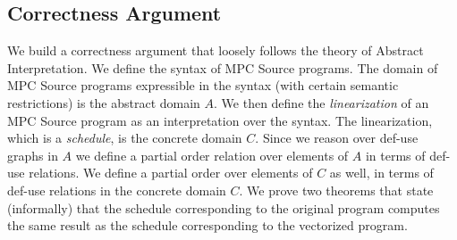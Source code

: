 \begin{algorithmic}

\ENDFOR

\ENDFOR
{}


\end{algorithmic}



\subsection{Correctness Argument}

We build a correctness argument that loosely follows the theory of Abstract Interpretation.
We define the syntax of MPC Source programs. The domain of MPC Source programs
expressible in the syntax (with certain semantic restrictions) is the abstract domain $A$.
We then define the \emph{linearization} of an MPC Source program as an interpretation
over the syntax. The linearization, which is a \emph{schedule}, is the concrete domain $C$.
Since we reason over def-use graphs in $A$ we define a partial order relation over elements of $A$
in terms of def-use relations. We define a partial order over elements of $C$ as well,
in terms of def-use relations in the concrete domain $C$. We prove two theorems
that state (informally) that the schedule corresponding to the original program computes the same
result as the schedule corresponding to the vectorized program.


